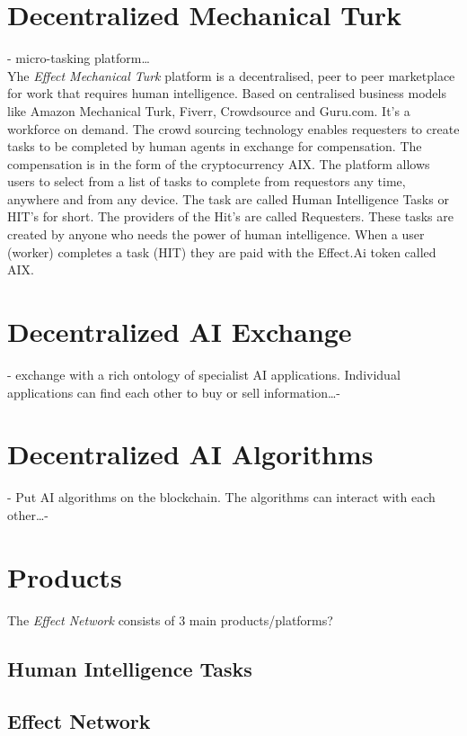 \documentclass{article}
\begin{document}
\section{Decentralized Mechanical Turk}
\label{sec:phase1}
- micro-tasking platform\dots\\
Yhe \emph{Effect Mechanical Turk} platform is a decentralised, peer to peer marketplace for work that requires human intelligence. Based on centralised business models like Amazon Mechanical Turk, Fiverr, Crowdsource and Guru.com. It’s a workforce on demand. The crowd sourcing technology enables requesters to create tasks to be completed by human agents in exchange for compensation. The compensation is in the form of the cryptocurrency AIX. The platform allows users to select from a list of tasks to complete from requestors any time, anywhere and from any device. The task are called Human Intelligence Tasks or HIT’s for short. The providers of the Hit’s are called Requesters. These tasks are created by anyone who needs the power of human intelligence. When a user (worker) completes a task (HIT) they are paid with the Effect.Ai token called AIX.\\

\section{Decentralized AI Exchange}
\label{sec:phase2}
- exchange with a rich ontology of specialist AI applications. Individual applications can find each other to buy or sell information\dots -

\section{Decentralized AI Algorithms}
\label{sec:phase3}
- Put AI algorithms on the blockchain. The algorithms can interact with each other\dots -
\section{Products}

The \emph{Effect Network} consists of 3 main products/platforms?

\subsection{Human Intelligence Tasks}

\subsection{Effect Network}
\end{document}
